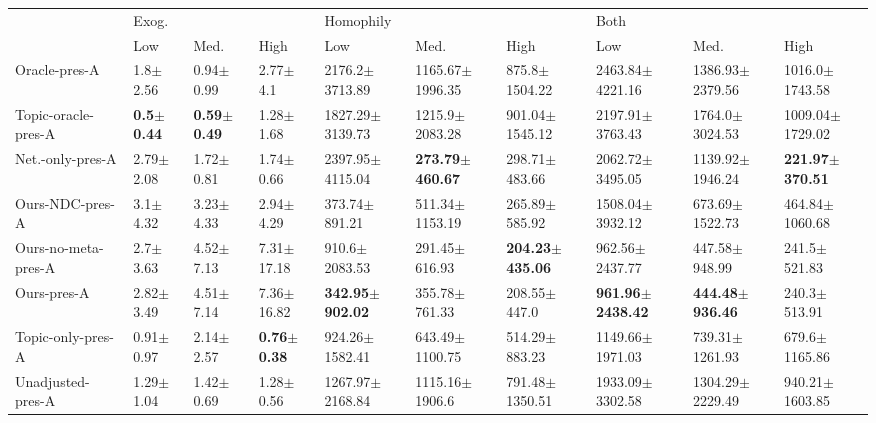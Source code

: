 \begin{tabular}{llllllllll}
\toprule
{} & \multicolumn{3}{l}{Exog.} & \multicolumn{3}{l}{Homophily} & \multicolumn{3}{l}{Both} \\
{} &                    Low &                    Med. &                    High &                         Low &                        Med. &                        High &                          Low &                        Med. &                        High \\
\midrule
Oracle-pres-A       &           1.8$\pm$2.56 &           0.94$\pm$0.99 &            2.77$\pm$4.1 &          2176.2$\pm$3713.89 &         1165.67$\pm$1996.35 &           875.8$\pm$1504.22 &          2463.84$\pm$4221.16 &         1386.93$\pm$2379.56 &          1016.0$\pm$1743.58 \\
Topic-oracle-pres-A &  \textbf{0.5$\pm$0.44} &  \textbf{0.59$\pm$0.49} &           1.28$\pm$1.68 &         1827.29$\pm$3139.73 &          1215.9$\pm$2083.28 &          901.04$\pm$1545.12 &          2197.91$\pm$3763.43 &          1764.0$\pm$3024.53 &         1009.04$\pm$1729.02 \\
Net.-only-pres-A    &          2.79$\pm$2.08 &           1.72$\pm$0.81 &           1.74$\pm$0.66 &         2397.95$\pm$4115.04 &  \textbf{273.79$\pm$460.67} &           298.71$\pm$483.66 &          2062.72$\pm$3495.05 &         1139.92$\pm$1946.24 &  \textbf{221.97$\pm$370.51} \\
Ours-NDC-pres-A     &           3.1$\pm$4.32 &           3.23$\pm$4.33 &           2.94$\pm$4.29 &           373.74$\pm$891.21 &          511.34$\pm$1153.19 &           265.89$\pm$585.92 &          1508.04$\pm$3932.12 &          673.69$\pm$1522.73 &          464.84$\pm$1060.68 \\
Ours-no-meta-pres-A &           2.7$\pm$3.63 &           4.52$\pm$7.13 &          7.31$\pm$17.18 &           910.6$\pm$2083.53 &           291.45$\pm$616.93 &  \textbf{204.23$\pm$435.06} &           962.56$\pm$2437.77 &           447.58$\pm$948.99 &            241.5$\pm$521.83 \\
Ours-pres-A         &          2.82$\pm$3.49 &           4.51$\pm$7.14 &          7.36$\pm$16.82 &  \textbf{342.95$\pm$902.02} &           355.78$\pm$761.33 &            208.55$\pm$447.0 &  \textbf{961.96$\pm$2438.42} &  \textbf{444.48$\pm$936.46} &            240.3$\pm$513.91 \\
Topic-only-pres-A   &          0.91$\pm$0.97 &           2.14$\pm$2.57 &  \textbf{0.76$\pm$0.38} &          924.26$\pm$1582.41 &          643.49$\pm$1100.75 &           514.29$\pm$883.23 &          1149.66$\pm$1971.03 &          739.31$\pm$1261.93 &           679.6$\pm$1165.86 \\
Unadjusted-pres-A   &          1.29$\pm$1.04 &           1.42$\pm$0.69 &           1.28$\pm$0.56 &         1267.97$\pm$2168.84 &          1115.16$\pm$1906.6 &          791.48$\pm$1350.51 &          1933.09$\pm$3302.58 &         1304.29$\pm$2229.49 &          940.21$\pm$1603.85 \\
\bottomrule
\end{tabular}
